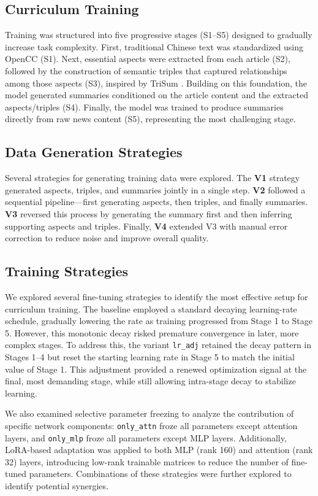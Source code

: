 \documentclass[preprint,12pt]{elsarticle}
\begin{document}
\subsection{Curriculum Training}
Training was structured into five progressive stages (S1–S5) designed to gradually increase task complexity. First, traditional Chinese text was standardized using OpenCC (S1). Next, essential aspects were extracted from each article (S2), followed by the construction of semantic triples that captured relationships among those aspects (S3), inspired by TriSum \cite{trisum}. Building on this foundation, the model generated summaries conditioned on the article content and the extracted aspects/triples (S4). Finally, the model was trained to produce summaries directly from raw news content (S5), representing the most challenging stage.

\subsection{Data Generation Strategies}
Several strategies for generating training data were explored.  
The \textbf{V1} strategy generated aspects, triples, and summaries jointly in a single step.  
\textbf{V2} followed a sequential pipeline—first generating aspects, then triples, and finally summaries.  
\textbf{V3} reversed this process by generating the summary first and then inferring supporting aspects and triples.  
Finally, \textbf{V4} extended V3 with manual error correction to reduce noise and improve overall quality.

\subsection{Training Strategies}
We explored several fine-tuning strategies to identify the most effective setup for curriculum training.  
The baseline employed a standard decaying learning-rate schedule, gradually lowering the rate as training progressed from Stage 1 to Stage 5.  
However, this monotonic decay risked premature convergence in later, more complex stages.  
To address this, the variant \texttt{lr\_adj} retained the decay pattern in Stages 1–4 but reset the starting learning rate in Stage 5 to match the initial value of Stage 1.  
This adjustment provided a renewed optimization signal at the final, most demanding stage, while still allowing intra-stage decay to stabilize learning.  

We also examined selective parameter freezing to analyze the contribution of specific network components:  
\texttt{only\_attn} froze all parameters except attention layers, and \texttt{only\_mlp} froze all parameters except MLP layers.  
Additionally, LoRA-based adaptation \cite{lora} was applied to both MLP (rank 160) and attention (rank 32) layers, introducing low-rank trainable matrices to reduce the number of fine-tuned parameters.  
Combinations of these strategies were further explored to identify potential synergies.
\end{document}
